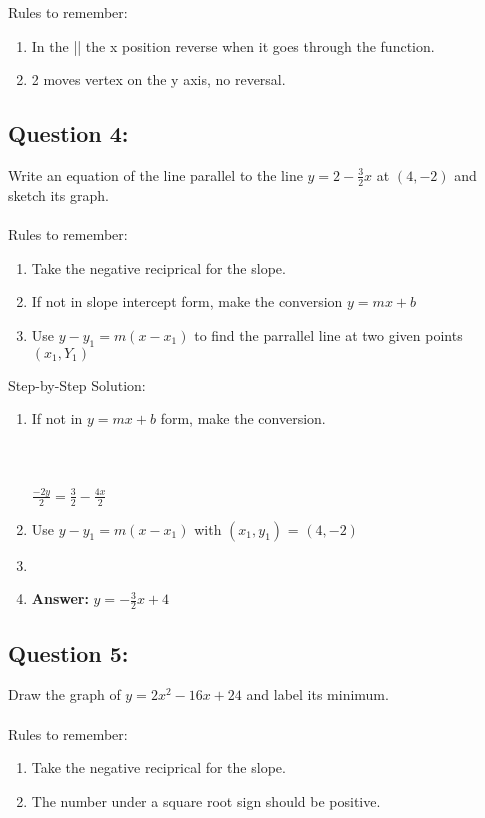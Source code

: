 \documentclass[12pt, letterpaper]{article}
\begin{document}
Rules to remember:
\begin{enumerate}
\item In the || the x position reverse when it goes through the function.
  \item 2 moves vertex on the y axis, no reversal. 
\end{enumerate}

\subsection{Question 4:}
Write an equation of the line parallel to the line 
  $y=2-\frac{3}{2}x$ at $(4,-2)$ and sketch its graph.
  \\\\
  Rules to remember:
  \begin{enumerate}
    \item Take the negative reciprical for the slope.
    \item If not in slope intercept form, make the conversion $y=mx+b$
    \item Use $y-y_1=m(x-x_1)$ to find the parrallel line at two given points $(x_1, Y_1)$
  \end{enumerate}

  Step-by-Step Solution:
  \begin{enumerate}
    \item If not in $y=mx+b$ form, make the conversion. \\
       \\
      \\\\
      $\frac{-2y}{2}=\frac{3}{2}-\frac{4x}{2}$
    \item Use $y-y_1=m(x-x_1)$ with $(x_1, y_1)$ = $(4, -2)$
    \item 
    \item \textbf{Answer:} $y=-\frac{3}{2}x+4$
  \end{enumerate}

  
\subsection{Question 5:}
  Draw the graph of $y=2x^2-16x+24$ and label its minimum.
  \\\\
  Rules to remember:
  \begin{enumerate}
    \item Take the negative reciprical for the slope.
    \item The number under a square root sign should be positive.
  \end{enumerate}
\end{document}
